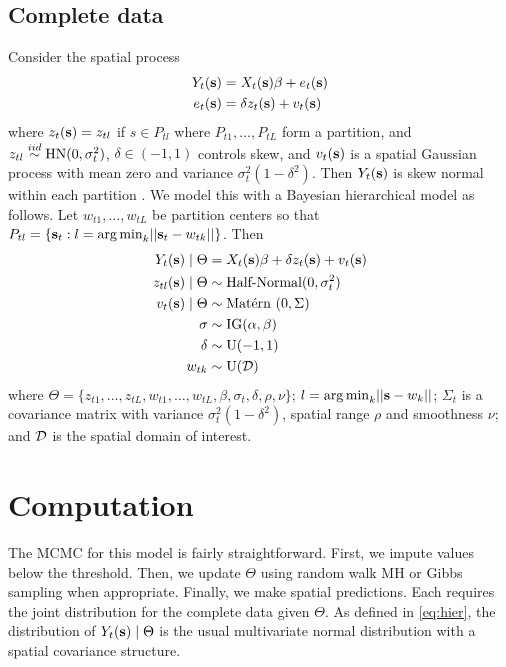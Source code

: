 \documentclass[11pt]{article}
\begin{document}
\subsection{Complete data}\label{s:model}
Consider the spatial process
\begin{align} \label{eq:fullmodel}
  Y_t(\mbox{\bf s}) &= X_t(\mbox{\bf s}) \beta + e_t(\mbox{\bf s})\\
  e_t(\mbox{\bf s}) &= \delta z_t(\mbox{\bf s}) + v_t(\mbox{\bf s})
\end{align}
where $z_t(\mbox{\bf s}) = z_{tl}$ if $s \in P_{tl}$ where $P_{t1}, \ldots, P_{tL}$ form a partition, and $z_{tl} \stackrel{iid}{\sim} \mbox{HN}(0, \sigma_t^2)$, $\delta \in (-1, 1)$ controls skew, and $v_t(\mbox{\bf s})$ is a spatial Gaussian process with mean zero and variance $\sigma_t^2(1 - \delta^2)$.
Then $Y_t(\mbox{\bf s})$ is skew normal within each partition \citep{Minozzo2012}.
We model this with a Bayesian hierarchical model as follows.
Let $w_{t1}, \ldots, w_{tL}$ be partition centers so that \mbox{$P_{tl} = \{\mbox{\bf s}_t : l = {\mathop{\rm arg\, min}}_k || \mbox{\bf s}_t - w_{tk} ||\}$}.
Then
\begin{align}
    Y_t(\mbox{\bf s}) \mid \Theta &= X_t(\mbox{\bf s}) \beta + \delta z_t(\mbox{\bf s}) + v_t(\mbox{\bf s}) \label{eq:hier}\\
    z_{tl}(\mbox{\bf s}) \mid \Theta &\sim \mbox{Half-Normal}(0, \sigma^2_t)\\
    v_t(\mbox{\bf s}) \mid \Theta &\sim \mbox{Mat$\acute{\mbox{e}}$rn }(0, \Sigma)\\
    \sigma &\sim \mbox{IG}(\alpha, \beta)\\
    \delta &\sim \mbox{U}(-1, 1)\\
    w_{tk} &\sim \mbox{U}({\cal D})
\end{align}
where $\Theta = \{z_{t1}, \ldots, z_{tL}, w_{t1}, \ldots, w_{tL}, \beta, \sigma_t, \delta, \rho, \nu \}$; $l = {\mathop{\rm arg\, min}}_k ||\mbox{\bf s} - w_k ||$; $\Sigma_t$ is a \Matern covariance matrix with variance $\sigma_t^2 (1 - \delta^2)$, spatial range $\rho$ and smoothness $\nu$; and ${\cal D}$ is the spatial domain of interest.

\section{Computation}\label{s:comp}
The MCMC for this model is fairly straightforward.
First, we impute values below the threshold.
Then, we update $\Theta$ using random walk MH or Gibbs sampling when appropriate.
Finally, we make spatial predictions.
Each requires the joint distribution for the complete data given $\Theta$.
As defined in \ref{eq:hier}, the distribution of $Y_t(\mbox{\bf s}) \mid \Theta$ is the usual multivariate normal distribution with a \Matern spatial covariance structure.
\end{document}
